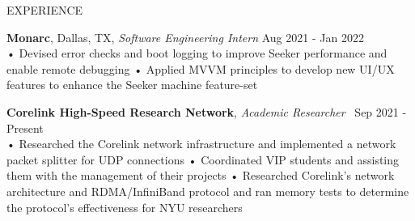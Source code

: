 \documentclass{resume} %
\begin{document}
\begin{rSection}{EXPERIENCE}

\textbf{\bf Monarc}, Dallas, TX, {\emph{Software Engineering Intern}} \hfill Aug 2021 - Jan 2022\\
• Devised error checks and boot logging to improve Seeker performance and enable remote debugging \newline
• Applied MVVM principles to develop new UI/UX features to enhance the Seeker machine feature-set \smallskip

\textbf{\bf Corelink High-Speed Research Network}, {\emph{Academic Researcher}} \ \hfill Sep 2021 - Present \\%
• Researched the Corelink network infrastructure and implemented a network packet splitter for UDP connections \newline
• Coordinated VIP students and assisting them with the management of their projects \newline
• Researched Corelink’s network architecture and RDMA/InfiniBand protocol and ran memory tests to determine the protocol's effectiveness for NYU researchers

\end{rSection} 
\end{document}
